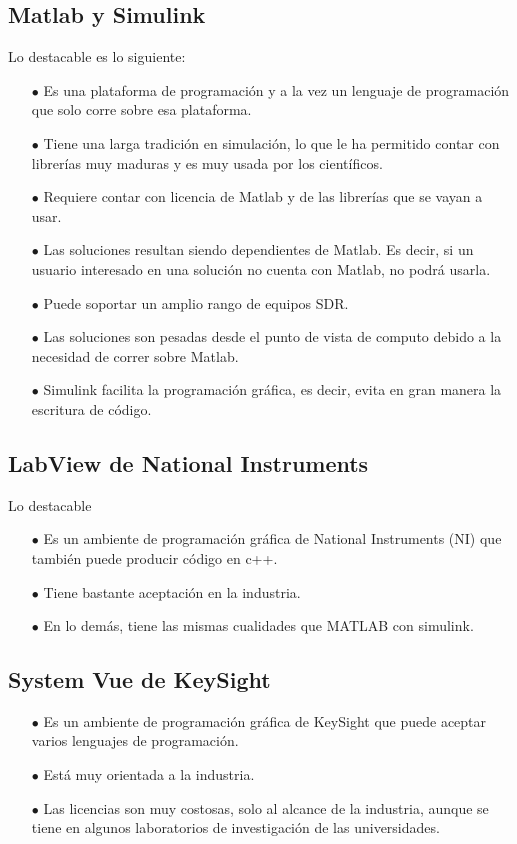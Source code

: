 \subsection{Matlab y Simulink}
Lo destacable es lo siguiente:
\begin{itemize}
   \item [$\bullet$] Es una plataforma de programación y a la vez un lenguaje de programación que solo corre sobre esa plataforma.
	\item [$\bullet$] Tiene una larga tradición en simulación, lo que le ha permitido contar con librerías muy maduras y es muy usada por los científicos.
    \item [$\bullet$] Requiere contar con licencia de Matlab y de las librerías que se vayan a usar.
    \item [$\bullet$] Las soluciones resultan siendo dependientes de Matlab. Es decir, si un usuario interesado en una solución no cuenta con Matlab, no podrá usarla.
    \item [$\bullet$] Puede soportar un amplio rango de equipos SDR.
    \item [$\bullet$] Las soluciones son pesadas desde el punto de vista de computo debido a la necesidad de correr sobre Matlab.
    \item [$\bullet$] Simulink facilita la programación gráfica, es decir, evita en gran manera la escritura de código.
\end{itemize}

\subsection{LabView de National Instruments}
Lo destacable
\begin{itemize}
	\item [$\bullet$] Es un ambiente de programación gráfica de National Instruments (NI) que también puede producir código en c++.
    \item [$\bullet$] Tiene bastante aceptación en la industria.
    \item [$\bullet$] En lo demás, tiene las mismas cualidades que MATLAB con simulink.
\end{itemize}
\subsection{System Vue de KeySight}
\begin{itemize}
	\item [$\bullet$]  Es un ambiente de programación gráfica de KeySight que puede aceptar varios lenguajes de programación.
    \item [$\bullet$] Está muy orientada a la industria.
    \item [$\bullet$]  Las licencias son muy costosas, solo al alcance de la industria, aunque se tiene en algunos laboratorios de investigación de las universidades.
\end{itemize}

